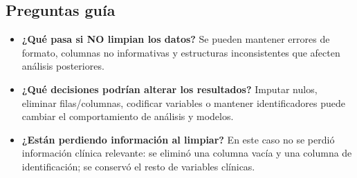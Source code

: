 \subsection{Preguntas guía}
\begin{itemize}
    \item \textbf{¿Qué pasa si NO limpian los datos?} Se pueden mantener errores de formato, columnas no informativas y estructuras inconsistentes que afecten análisis posteriores.
    \item \textbf{¿Qué decisiones podrían alterar los resultados?} Imputar nulos, eliminar filas/columnas, codificar variables o mantener identificadores puede cambiar el comportamiento de análisis y modelos.
    \item \textbf{¿Están perdiendo información al limpiar?} En este caso no se perdió información clínica relevante: se eliminó una columna vacía y una columna de identificación; se conservó el resto de variables clínicas.
\end{itemize}
